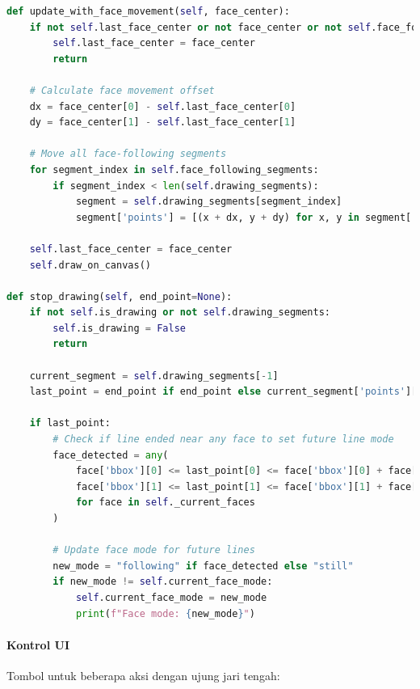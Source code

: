 \documentclass[11pt,a4paper]{article}
\begin{document}
\begin{lstlisting}[language=Python, caption=Implementasi face-following drawings]
def update_with_face_movement(self, face_center):
    if not self.last_face_center or not face_center or not self.face_following_segments:
        self.last_face_center = face_center
        return
    
    # Calculate face movement offset
    dx = face_center[0] - self.last_face_center[0]
    dy = face_center[1] - self.last_face_center[1]
    
    # Move all face-following segments
    for segment_index in self.face_following_segments:
        if segment_index < len(self.drawing_segments):
            segment = self.drawing_segments[segment_index]
            segment['points'] = [(x + dx, y + dy) for x, y in segment['points']]
    
    self.last_face_center = face_center
    self.draw_on_canvas()

def stop_drawing(self, end_point=None):
    if not self.is_drawing or not self.drawing_segments:
        self.is_drawing = False
        return
    
    current_segment = self.drawing_segments[-1]
    last_point = end_point if end_point else current_segment['points'][-1]
    
    if last_point:
        # Check if line ended near any face to set future line mode
        face_detected = any(
            face['bbox'][0] <= last_point[0] <= face['bbox'][0] + face['bbox'][2] and
            face['bbox'][1] <= last_point[1] <= face['bbox'][1] + face['bbox'][3]
            for face in self._current_faces
        )
        
        # Update face mode for future lines
        new_mode = "following" if face_detected else "still"
        if new_mode != self.current_face_mode:
            self.current_face_mode = new_mode
            print(f"Face mode: {new_mode}")
\end{lstlisting}

\paragraph{Kontrol UI}
Tombol untuk beberapa aksi dengan ujung jari tengah:
\end{document}
